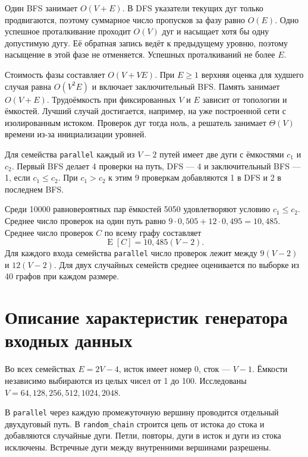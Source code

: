 \documentclass[14pt,a4paper]{extarticle}
\newcommand{\family}[1]{\texttt{#1}}
\begin{document}
Один BFS занимает $O(V+E)$. В DFS указатели текущих дуг только продвигаются, поэтому суммарное число пропусков за фазу равно $O(E)$. Одно успешное проталкивание проходит $O(V)$ дуг и насыщает хотя бы одну допустимую дугу. Её обратная запись ведёт к предыдущему уровню, поэтому насыщение в этой фазе не отменяется. Успешных проталкиваний не более $E$.

Стоимость фазы составляет $O(V+VE)$. При $E\geq 1$ верхняя оценка для худшего случая равна $O(V^2E)$ и включает заключительный BFS. Память занимает $O(V+E)$. Трудоёмкость при фиксированных $V$ и $E$ зависит от топологии и ёмкостей. Лучший случай достигается, например, на уже построенной сети с изолированным истоком. Проверок дуг тогда ноль, а решатель занимает $\Theta(V)$ времени из-за инициализации уровней.

Для семейства \family{parallel} каждый из $V-2$ путей имеет две дуги с ёмкостями $c_1$ и $c_2$. Первый BFS делает 4 проверки на путь, DFS --- 4 и заключительный BFS --- 1, если $c_1\leq c_2$. При $c_1>c_2$ к этим 9 проверкам добавляются 1 в DFS и 2 в последнем BFS.

Среди \num{10000} равновероятных пар ёмкостей \num{5050} удовлетворяют условию $c_1\leq c_2$. Среднее число проверок на один путь равно $9\cdot 0{,}505 + 12\cdot 0{,}495 = 10{,}485$. Среднее число проверок $C$ по всему графу составляет
\begin{equation}
  \operatorname{E}[C] = 10{,}485(V-2).
  \label{eq:parallel-mean}
\end{equation}
Для каждого входа семейства \family{parallel} число проверок лежит между $9(V-2)$ и $12(V-2)$. Для двух случайных семейств среднее оценивается по выборке из 40 графов при каждом размере.

\clearpage
\section{Описание характеристик генератора входных данных}

Во всех семействах $E=2V-4$, исток имеет номер 0, сток --- $V-1$. Ёмкости независимо выбираются из целых чисел от 1 до 100. Исследованы $V=64,128,256,512,1024,2048$.

В \family{parallel} через каждую промежуточную вершину проводится отдельный двухдуговый путь. В \family{random\_chain} строится цепь от истока до стока и добавляются случайные дуги. Петли, повторы, дуги в исток и дуги из стока исключены. Встречные дуги между внутренними вершинами разрешены.
\end{document}
